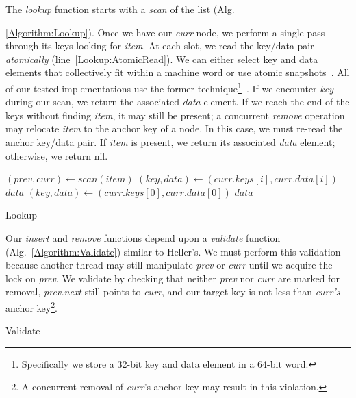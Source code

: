 \documentclass{llncs}
\begin{document}
The {\em lookup} function starts with a {\em scan} of the list (Alg.~{\ref{Algorithm:Lookup}).  
Once we have our {\em curr} node, we 
perform a single pass through its keys looking for {\em item}.  At each slot, we read the key/data
pair {\em atomically} (line~\ref{Lookup:AtomicRead}).  We can either select key and data elements 
that collectively fit within a machine word or 
use atomic snapshots~\cite{Afek:Atomic,Anderson:Composite}. 
All of our tested implementations use the former technique\footnote{Specifically we store a 32-bit key and data element 
in a 64-bit word.}~\cite{Braginsky}.
If we encounter {\em key} during our scan, we return the associated
{\em data} element. If we reach the end of the keys without finding {\em item}, 
it may still be present; a concurrent {\em remove} operation 
may relocate {\em item} to the anchor key of  a node.  
In this case, we must re-read the anchor key/data pair.  If {\em item} is present, we return 
its associated {\em data} element; otherwise, we return {\sc nil}.

\begin{algorithm}
\DontPrintSemicolon
{} {
    $(prev,curr) \leftarrow scan(item)$ \;
     { \label{Lookup:Loopbegin}
        $(key, data) \leftarrow (curr.keys[i],curr.data[i])$ \label{Lookup:AtomicRead} \;
         { \Return $data$ \label{Lookup:Loopend} }
    } 
    $(key,data) \leftarrow (curr.keys[0],curr.data[0])$ \;
     { \Return $data$  }
     \label{LP:Lookup3} \;
}
\caption{Lookup}
\label{Algorithm:Lookup}
\end{algorithm}


Our {\em insert} and {\em remove} functions depend upon a {\em validate} function
(Alg.~{\ref{Algorithm:Validate}}) similar to Heller's{\cite{Heller:LazyList}}. 
We must perform this validation because another thread may still manipulate {\em prev}
or {\em curr} until we acquire the lock on {\em prev}.
We validate by checking that neither {\em prev} nor {\em curr} are marked for removal,
{\em prev.next} still points to {\em curr}, and our target key is not less than 
{\em curr's} anchor key\footnote{A concurrent removal of {\em curr}'s anchor key may
result in this violation.}.
\begin{algorithm*}
\DontPrintSemicolon
{}
\caption{Validate}
\label{Algorithm:Validate}
\end{algorithm*}

}
\end{document}
